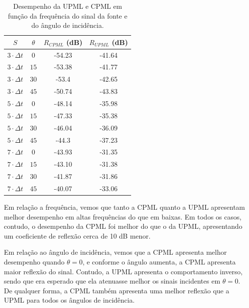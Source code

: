 \begin{table}[h!]
	\caption{Desempenho da UPML e CPML em função da frequência do sinal da fonte e 
	do ângulo de incidência.}
	\vspace{0.5cm}
	\centering
		\begin{tabular}{c|c|c|c}

		$S$ & $\theta$ & $R_{CPML}$ (dB) & $R_{UPML}$ (dB) \\ \hline
		$3 \cdot \Delta t$    & $0$ & -54.23 & -41.64  \\ \hline
		$3 \cdot \Delta t$   & $15$ & -53.38 & -41.77     \\ \hline
		$3 \cdot \Delta t$    & $30$ & -53.4 & -42.65     \\ \hline
		$3 \cdot \Delta t$    & $45$ & -50.74 & -43.83     \\ \hline 
 		 \hline 
		$5 \cdot \Delta t$    & $0$ & -48.14 & -35.98    \\ \hline
		$5 \cdot \Delta t$   & $15$ & -47.33 & -35.38   \\ \hline
		$5 \cdot \Delta t$    & $30$ & -46.04 & -36.09    \\ \hline
		$5 \cdot \Delta t$    & $45$ & -44.3 & -37.23    \\ \hline
		 \hline 
		$7 \cdot \Delta t$    & $0$ & -43.93 & -31.35    \\ \hline
		$7 \cdot \Delta t$   & $15$ & -43.10 & -31.38    \\ \hline
		$7 \cdot \Delta t$    & $30$ & -41.87 & -31.86    \\ \hline
		$7 \cdot \Delta t$    & $45$ & -40.07 & -33.06   \\ \hline
		\end{tabular}
	\label{tab:resultado-9-8}
\end{table}

Em relação a frequência, vemos que tanto a CPML quanto a UPML apresentam 
melhor desempenho em altas frequências do que em baixas. Em todos os casos, 
contudo, o desempenho da CPML foi melhor do que o da UPML, apresentando um
coeficiente de reflexão cerca de 10 dB menor. 

Em relação ao ângulo de incidência, vemos que a CPML apresenta melhor desempenho 
quando $\theta = 0$, e conforme o ângulo aumenta, a CPML apresenta maior reflexão do sinal. 
Contudo, a UPML apresenta o comportamento inverso, sendo que era esperado que ela atenuasse melhor
os sinais incidentes em $\theta = 0$. De qualquer forma, a CPML também apresenta uma melhor reflexão
que a UPML para todos os ângulos de incidência. 

